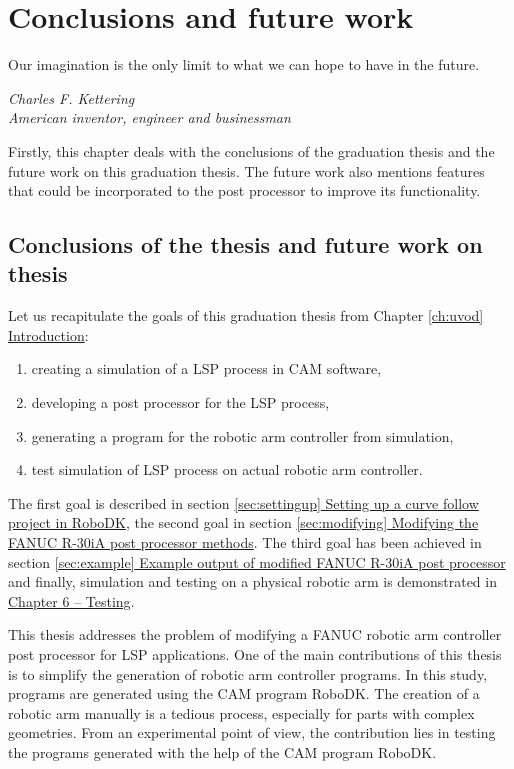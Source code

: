 ﻿\chapter{Conclusions and future work \label{chap:discussion}}

\epigraph{Our imagination is the only limit to what we can hope to have in the future.}{\textit{Charles F. Kettering \\ American inventor, engineer and businessman }}

Firstly, this chapter deals with the conclusions of the graduation thesis and the future work on this graduation thesis. The future work also mentions features that could be incorporated to the post processor to improve its functionality. 

\section{Conclusions of the thesis and future work on thesis}

Let us recapitulate the goals of this graduation thesis from Chapter \hyperref[ch:uvod]{\ref{ch:uvod} Introduction}:

\begin{enumerate}

    \item creating a simulation of a LSP process in CAM software,
    \item developing a post processor for the LSP process, 
    \item generating a program  for the robotic arm controller from simulation,
    \item test simulation of LSP process on actual robotic arm controller.
    
\end{enumerate}

\pagebreak[4]

The first goal is described in section  \hyperref[sec:settingup]{\ref{sec:settingup} Setting up a curve follow project in RoboDK}, the second goal in section  \hyperref[sec:modifying]{\ref{sec:modifying} Modifying the FANUC R-30iA post processor methods}. The third goal has been achieved in section  \hyperref[sec:example]{\ref{sec:example} Example output of modified FANUC R-30iA post processor} and finally, simulation and testing on a physical robotic arm is demonstrated in \hyperref[chap:testing]{Chapter 6 -- Testing}.

This thesis addresses the problem of modifying a FANUC robotic arm controller post processor for LSP applications. One of the main contributions of this thesis is to simplify the generation of robotic arm controller programs. In this study, programs are generated using the CAM  program RoboDK. The creation of a robotic arm manually is a tedious process, especially for parts with complex geometries. From an experimental point of view, the contribution lies in testing the programs generated with the help of the CAM program RoboDK.


